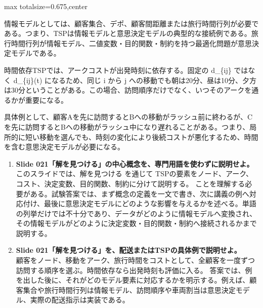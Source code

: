 \begin{adjustbox}{max totalsize={\textwidth}{0.675\textheight},center}
\begin{minipage}{\textwidth}
\begin{minipage}[t]{0.485\textwidth}
情報モデルとしては、顧客集合、デポ、顧客間距離または旅行時間行列が必要である。つまり、TSPは情報モデルと意思決定モデルの典型的な接続例である。旅行時間行列が情報モデル、二値変数・目的関数・制約を持つ最適化問題が意思決定モデルである。\par
時間依存TSPでは、アークコストが出発時刻に依存する。固定の d\_\{ij\} ではなく d\_\{ij\}(t) になるため、同じ i から j への移動でも朝は20分、昼は10分、夕方は30分ということがある。この場合、訪問順序だけでなく、いつそのアークを通るかが重要になる。\par
具体例として、顧客Aを先に訪問するとBへの移動がラッシュ前に終わるが、Cを先に訪問するとBへの移動がラッシュ中になり遅れることがある。つまり、局所的に短い移動を選んでも、時刻の変化により後続コストが悪化するため、時間を含む意思決定モデルが必要になる。\par
{}
\begin{enumerate}
\item \textbf{Slide 021「解を見つける」の中心概念を、専門用語を使わずに説明せよ。}\\このスライドでは、解を見つける を通じて TSPの要素をノード、アーク、コスト、決定変数、目的関数、制約に分けて説明する。 ことを理解する必要がある。試験答案では、まず概念の定義を一文で書き、次に講義の例へ対応付け、最後に意思決定モデルにどのような影響を与えるかを述べる。単語の列挙だけでは不十分であり、データがどのように情報モデルへ変換され、その情報モデルがどのように決定変数・目的関数・制約へ接続されるかまで説明する。
\item \textbf{Slide 021「解を見つける」を、配送またはTSPの具体例で説明せよ。}\\顧客をノード、移動をアーク、旅行時間をコストとして、全顧客を一度ずつ訪問する順序を選ぶ。時間依存なら出発時刻も評価に入る。 答案では、例を出した後に、それがどのモデル要素に対応するかを明示する。例えば、顧客集合や旅行時間行列は情報モデル、訪問順序や車両割当は意思決定モデル、実際の配送指示は実装である。
\end{enumerate}
\end{minipage}
\end{minipage}
\end{adjustbox}


